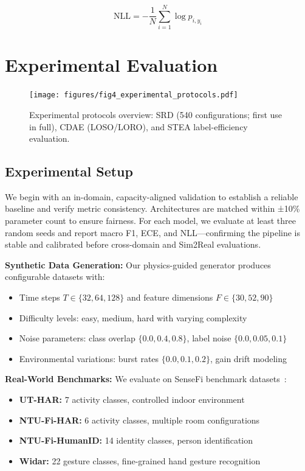 \documentclass[journal]{IEEEtran}
\begin{document}
\begin{equation}
\text{NLL} = -\frac{1}{N} \sum_{i=1}^{N} \log p_{i,y_i}
\end{equation}

\section{Experimental Evaluation}

\begin{figure}[t]
\centering
\texttt{[image: figures/fig4\_experimental\_protocols.pdf]}
\caption{Experimental protocols overview: SRD (540 configurations; first use in full), CDAE (LOSO/LORO), and STEA label-efficiency evaluation.}
\label{fig:protocols}
\end{figure}

\subsection{Experimental Setup}

We begin with an in-domain, capacity-aligned validation to establish a reliable baseline and verify metric consistency. Architectures are matched within ±10\% parameter count to ensure fairness. For each model, we evaluate at least three random seeds and report macro F1, ECE, and NLL—confirming the pipeline is stable and calibrated before cross-domain and Sim2Real evaluations.


\textbf{Synthetic Data Generation:} Our physics-guided generator produces configurable datasets with:
\begin{itemize}
\item Time steps $T \in \{32, 64, 128\}$ and feature dimensions $F \in \{30, 52, 90\}$
\item Difficulty levels: easy, medium, hard with varying complexity
\item Noise parameters: class overlap $\{0.0, 0.4, 0.8\}$, label noise $\{0.0, 0.05, 0.1\}$
\item Environmental variations: burst rates $\{0.0, 0.1, 0.2\}$, gain drift modeling
\end{itemize}

\textbf{Real-World Benchmarks:} We evaluate on SenseFi benchmark datasets~\cite{yang2023sensefi}:
\begin{itemize}
\item \textbf{UT-HAR:} 7 activity classes, controlled indoor environment
\item \textbf{NTU-Fi-HAR:} 6 activity classes, multiple room configurations
\item \textbf{NTU-Fi-HumanID:} 14 identity classes, person identification
\item \textbf{Widar:} 22 gesture classes, fine-grained hand gesture recognition
\end{itemize}
\end{document}
